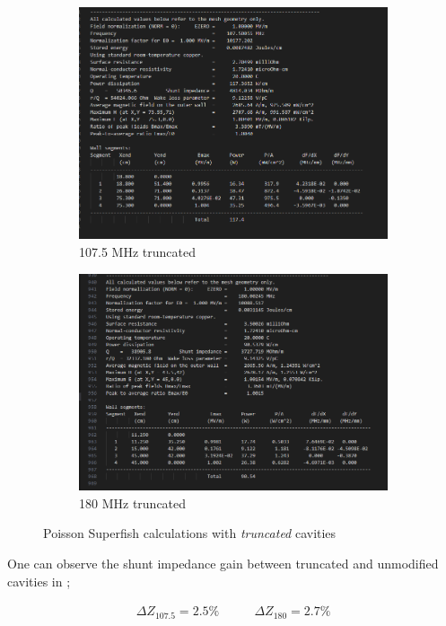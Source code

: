 \documentclass{article}
\begin{document}
\begin{figure}[H]
    \centering
    \begin{subfigure}{.5\textwidth}
      \centering
      \includegraphics[width=0.95\linewidth]{../../../figures/superfish/superfish107mod_z.png}
      \caption{107.5 MHz truncated}
    \end{subfigure}%
    \begin{subfigure}{.5\textwidth}
      \centering
      \includegraphics[width=\linewidth]{../../../figures/superfish/superfish180mod_z.png}
      \caption{180 MHz truncated}
    \end{subfigure}
    \caption{Poisson Superfish calculations with \textit{truncated} cavities}
    \label{fig:180_cavity_shunt_diff}
\end{figure}
    

One can observe the shunt impedance gain between truncated and unmodified cavities in ;

\begin{equation*}
    \begin{aligned}
        \Delta Z_{107.5}=2.5\%
    \end{aligned}
    \qquad
    \begin{aligned}
        \Delta Z_{180}=2.7\%
    \end{aligned}
\end{equation*}



\end{document}

